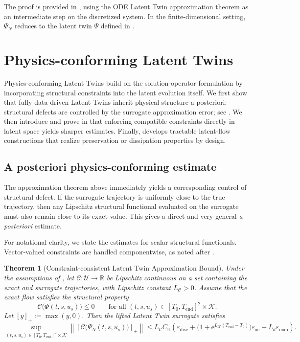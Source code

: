\documentclass[a4paper,fleqn]{cas-sc}
\theoremstyle{thmstyleone}%
\newtheorem{theorem}{Theorem}%
\theoremstyle{thmstyletwo}%
\theoremstyle{thmstylethree}%
\begin{document}
The proof is provided in \cite{chung2026latent}, using the ODE Latent Twin approximation theorem as an intermediate step on the discretized system. In the finite-dimensional setting, $\Psi_N$ reduces to the latent twin $\Psi$ defined in .

\section{Physics-conforming Latent Twins}\label{sec:method}

Physics-conforming Latent Twins build on the solution-operator formulation by incorporating structural constraints into the latent evolution itself. We first show that fully data-driven Latent Twins inherit physical structure a posteriori: structural defects are controlled by the surrogate approximation error; see . We then introduce and prove in  that enforcing compatible constraints directly in latent space yields sharper estimates. Finally,  develops tractable latent-flow constructions that realize preservation or dissipation properties by design.

\subsection{A posteriori physics-conforming estimate}\label{sec:posteriorConform}
The approximation theorem above immediately yields a corresponding control of structural defect. If the surrogate trajectory is uniformly close to the true trajectory, then any Lipschitz structural functional evaluated on the surrogate must also remain close to its exact value. This gives a direct and very general \emph{a posteriori} estimate.

For notational clarity, we state the estimates for scalar structural functionals. Vector-valued constraints are handled componentwise, as noted after .

\begin{theorem}[Constraint-consistent Latent Twin Approximation Bound]
\label{thm:constraint-consistent}
Under the assumptions of , let $\mathcal{C}:\mathcal{U}\to\mathbb{R}$ be Lipschitz continuous on a set containing the exact and surrogate trajectories, with Lipschitz constant $L_{\mathcal{C}}>0$. Assume that the exact flow satisfies the structural property
$$
\mathcal{C}\bigl(\Phi(t,s,u_s)\bigr)\leq 0
\qquad \text{for all } (t,s,u_s)\in[T_0,T_{\mathrm{end}}]^2\times\mathcal{K}.
$$
Let $[y]_+ := \max(y,0)$. Then the lifted Latent Twin surrogate satisfies
$$
\sup_{(t,s,u_s)\in[T_0,T_{\mathrm{end}}]^2\times\mathcal{K}}
\left\|
\left[
\mathcal{C}\bigl(\Psi_{N}(t,s,u_s)\bigr)
\right]_+
\right\|
\leq
L_{\mathcal C} C_{\mathrm{lt}}
\left(
\varepsilon_{\mathrm{disc}}
+
\bigl(1+\mathrm{e}^{L_{\mathcal K}(T_{\mathrm{end}}-T_0)}\bigr)\varepsilon_{\mathrm{ae}}
+
L_{d}\varepsilon_{\mathrm{map}}
\right).
$$
\end{theorem}
\end{document}
